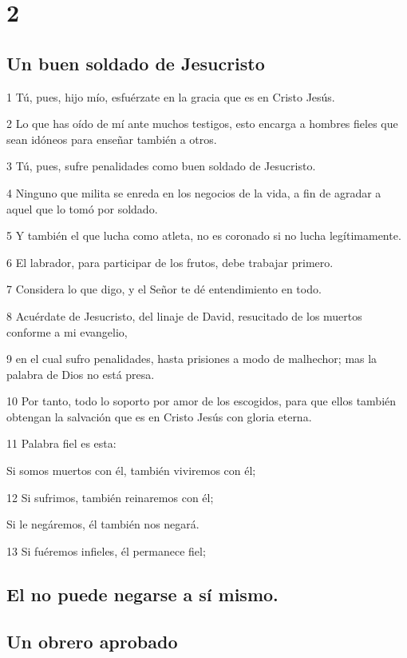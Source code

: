 \chapter{2}

\section*{Un buen soldado de Jesucristo}

\par 1 Tú, pues, hijo mío, esfuérzate en la gracia que es en Cristo Jesús.
\par 2 Lo que has oído de mí ante muchos testigos, esto encarga a hombres fieles que sean idóneos para enseñar también a otros.
\par 3 Tú, pues, sufre penalidades como buen soldado de Jesucristo.
\par 4 Ninguno que milita se enreda en los negocios de la vida, a fin de agradar a aquel que lo tomó por soldado.
\par 5 Y también el que lucha como atleta, no es coronado si no lucha legítimamente.
\par 6 El labrador, para participar de los frutos, debe trabajar primero.
\par 7 Considera lo que digo, y el Señor te dé entendimiento en todo.
\par 8 Acuérdate de Jesucristo, del linaje de David, resucitado de los muertos conforme a mi evangelio,
\par 9 en el cual sufro penalidades, hasta prisiones a modo de malhechor; mas la palabra de Dios no está presa.
\par 10 Por tanto, todo lo soporto por amor de los escogidos, para que ellos también obtengan la salvación que es en Cristo Jesús con gloria eterna.
\par 11 Palabra fiel es esta:
\par Si somos muertos con él, también viviremos con él;
\par 12 Si sufrimos, también reinaremos con él;
\par Si le negáremos, él también nos negará.
\par 13 Si fuéremos infieles, él permanece fiel;
\section*{El no puede negarse a sí mismo.}

\section*{Un obrero aprobado}

